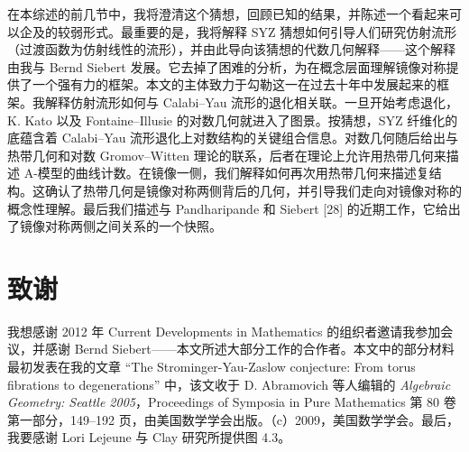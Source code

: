 在本综述的前几节中，我将澄清这个猜想，回顾已知的结果，并陈述一个看起来可以企及的较弱形式。最重要的是，我将解释 SYZ 猜想如何引导人们研究仿射流形（过渡函数为仿射线性的流形），并由此导向该猜想的代数几何解释------这个解释由我与 Bernd Siebert 发展。它去掉了困难的分析，为在概念层面理解镜像对称提供了一个强有力的框架。本文的主体致力于勾勒这一在过去十年中发展起来的框架。我解释仿射流形如何与 Calabi--Yau 流形的退化相关联。一旦开始考虑退化，K. Kato 以及 Fontaine--Illusie 的对数几何就进入了图景。按猜想，SYZ 纤维化的底蕴含着 Calabi--Yau 流形退化上对数结构的关键组合信息。对数几何随后给出与热带几何和对数 Gromov--Witten 理论的联系，后者在理论上允许用热带几何来描述 A-模型的曲线计数。在镜像一侧，我们解释如何再次用热带几何来描述复结构。这确认了热带几何是镜像对称两侧背后的几何，并引导我们走向对镜像对称的概念性理解。最后我们描述与 Pandharipande 和 Siebert [28] 的近期工作，它给出了镜像对称两侧之间关系的一个快照。

\section*{致谢}
我想感谢 2012 年 Current Developments in Mathematics 的组织者邀请我参加会议，并感谢 Bernd Siebert------本文所述大部分工作的合作者。本文中的部分材料最初发表在我的文章 “The Strominger-Yau-Zaslow conjecture: From torus fibrations to degenerations” 中，该文收于 D. Abramovich 等人编辑的 \emph{Algebraic Geometry: Seattle 2005}，Proceedings of Symposia in Pure Mathematics 第 80 卷第一部分，149--192 页，由美国数学学会出版。（c）2009，美国数学学会。最后，我要感谢 Lori Lejeune 与 Clay 研究所提供图 4.3。

